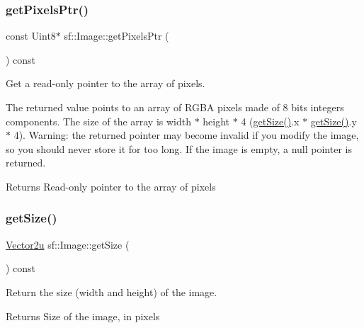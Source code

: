 \subsubsection{\texorpdfstring{getPixelsPtr()}{getPixelsPtr()}}
{\footnotesize\ttfamily const Uint8$\ast$ sf\+::\+Image\+::get\+Pixels\+Ptr (\begin{DoxyParamCaption}{ }\end{DoxyParamCaption}) const}



Get a read-\/only pointer to the array of pixels. 

The returned value points to an array of R\+G\+BA pixels made of 8 bits integers components. The size of the array is width $\ast$ height $\ast$ 4 (\mbox{\hyperlink{classsf_1_1_image_a85409951b05369813069ed64393391ce}{get\+Size()}}.x $\ast$ \mbox{\hyperlink{classsf_1_1_image_a85409951b05369813069ed64393391ce}{get\+Size()}}.y $\ast$ 4). Warning\+: the returned pointer may become invalid if you modify the image, so you should never store it for too long. If the image is empty, a null pointer is returned.

\begin{DoxyReturn}{Returns}
Read-\/only pointer to the array of pixels \begin{DoxyVerb}\end{DoxyVerb}
 
\end{DoxyReturn}
\mbox{\label{classsf_1_1_image_a85409951b05369813069ed64393391ce}} 
\subsubsection{\texorpdfstring{getSize()}{getSize()}}
{\footnotesize\ttfamily \mbox{\hyperlink{classsf_1_1_vector2}{Vector2u}} sf\+::\+Image\+::get\+Size (\begin{DoxyParamCaption}{ }\end{DoxyParamCaption}) const}



Return the size (width and height) of the image. 

\begin{DoxyReturn}{Returns}
Size of the image, in pixels \begin{DoxyVerb}\end{DoxyVerb}
 
\end{DoxyReturn}
\mbox{\label{classsf_1_1_image_a9e4f2aa8e36d0cabde5ed5a4ef80290b}} 
